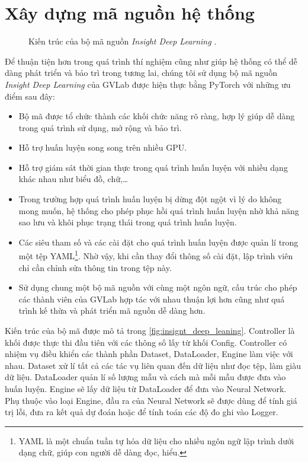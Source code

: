 \section{Xây dựng mã nguồn hệ thống} 
\label{sec:xay_dung_ma_nguon_he_thong}
	\begin{figure}[h!]
		\centering
		
		\caption[Kiến trúc của bộ mã nguồn \textit{Insight Deep Learning}]{Kiến trúc của bộ mã nguồn \textit{Insight Deep Learning} .}
		\label{fig:insignt_deep_leaning}
	\end{figure}
	Để thuận tiện hơn trong quá trình thí nghiệm cũng như giúp hệ thống có thể dễ dàng phát triển và bảo trì trong tương lai, chúng tôi sử dụng bộ mã nguồn \textit{Insight Deep Learning} của GVLab được hiện thực bằng PyTorch với những ưu điểm sau đây:
	\begin{itemize}
		\setlength\itemsep{0em}
		\item Bộ mã được tổ chức thành các khối chức năng rõ ràng, hợp lý giúp dễ dàng trong quá trình sử dụng, mở rộng và bảo trì.
		\item Hỗ trợ huấn luyện song song trên nhiều GPU.
		\item Hỗ trợ giám sát thời gian thực trong quá trình huấn luyện với nhiều dạng khác nhau như biểu đồ, chữ,\ldots
		\item Trong trường hợp quá trình huấn luyện bị dừng đột ngột vì lý do không mong muốn, hệ thống cho phép phục hồi quá trình huấn luyện nhờ khả năng sao lưu và khôi phục trạng thái trong quá trình huấn luyện.
		\item Các siêu tham số và các cài đặt cho quá trình huấn luyện được quản lí trong một tệp YAML\footnote{YAML là một chuẩn tuần tự hóa dữ liệu cho nhiều ngôn ngữ lập trình dưới dạng chữ, giúp con người dễ dàng đọc, hiểu.}. Nhờ vậy, khi cần thay đổi thông số cài đặt, lập trình viên chỉ cần chỉnh sửa thông tin trong tệp này.
		\item Sử dụng chung một bộ mã nguồn với cùng một ngôn ngữ, cấu trúc cho phép các thành viên của GVLab hợp tác với nhau thuận lợi hơn cũng như quá trình kế thừa và phát triển mã nguồn dễ dàng hơn.
	\end{itemize}
	Kiến trúc của bộ mã được mô tả trong \autoref{fig:insignt_deep_leaning}. Controller là khối được thực thi đầu tiên với các thông số lấy từ khối Config. Controller có nhiệm vụ điều khiển các thành phần Dataset, DataLoader, Engine làm việc với nhau. Dataset xử lí tất cả các tác vụ liên quan đến dữ liệu như đọc tệp, làm giàu dữ liệu. DataLoader quản lí số lượng mẫu và cách mà mỗi mẫu được đưa vào huấn luyện. Engine sẽ lấy dữ liệu từ DataLoader để đưa vào Neural Network. Phụ thuộc vào loại Engine, đầu ra của Neural Network sẽ được dùng để tính giá trị lỗi, đưa ra kết quả dự đoán hoặc để tính toán các độ đo ghi vào Logger.
	
